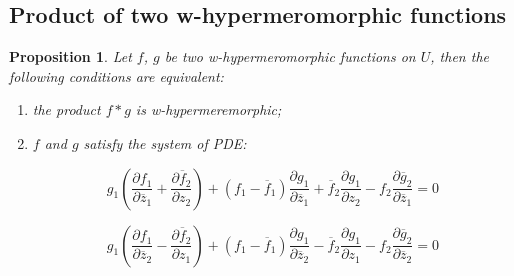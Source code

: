 \documentclass[12pt]{amsart}
\newtheorem{prop}[thm]{Proposition}
\theoremstyle{definition}
\begin{document}
\subsection{Product of two w-hypermeromorphic functions}

\begin{prop}Let $f$, $g$ be two w-hypermeromorphic functions on $U$, then the following conditions are equivalent:
\begin{enumerate}
\item[$(i)$] the product $f*g$ is w-hypermeremorphic;
\item[$(ii)$] $f$ and $g$ satisfy the system of PDE:

$$
g_1(\frac{\partial
f_1}{\partial\overline z_1}+\frac{\partial\overline f_2}{\partial z_2})+(f_1-\overline f_1)\frac{\partial g_1}{\partial\overline z_1}+\overline f_2\frac{\partial g_1}{\partial z_2}-f_2\frac{\partial\overline g_2}{\partial\overline z_1}=0
$$

$$
g_1(\frac{\partial
f_1}{\partial\overline z_2}-\frac{\partial\overline f_2}{\partial z_1})+(f_1-\overline f_1)\frac{\partial g_1}{\partial\overline z_2}-\overline f_2\frac{\partial g_1}{\partial z_1}-f_2\frac{\partial\overline g_2}{\partial\overline z_2}=0
$$
\end{enumerate}
\end{prop}
\end{document}
